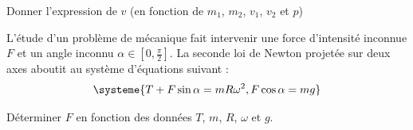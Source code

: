 
\begin{enonce}
Donner l'expression de $v$ (en fonction de $m_1$, $m_2$, $v_1$, $v_2$ et $p$)
\end{enonce}




\finEntrainement


\hauteurLargeurCadreReponse		{1cm}{4.4cm}
\initialisationEntrainement


\debutEntrainement

L'étude d'un problème de mécanique fait intervenir une force d'intensité inconnue $F$ et un angle inconnu $\alpha\in[0,\frac{\pi}{2}]$. La seconde loi de Newton projetée sur deux axes aboutit au système d'équations suivant :
	\[
	\systeme{T+F\sin\alpha=mR\omega^2,F\cos\alpha=mg}
	\]


\begin{enonce}
Déterminer $F$ en fonction des données $T$, $m$, $R$, $\omega$ et $g$.
\end{enonce}

